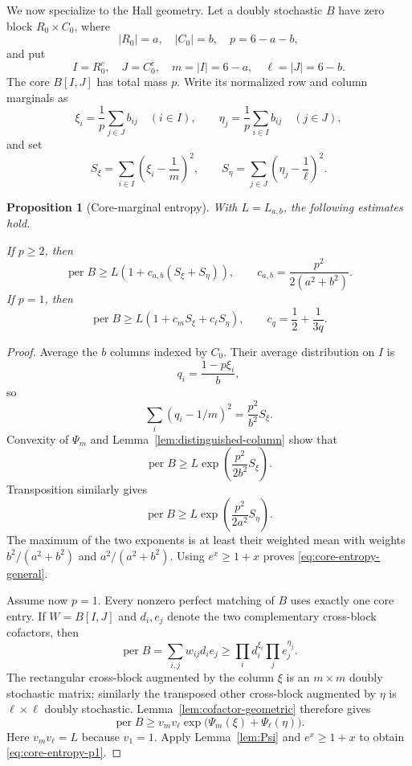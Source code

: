 \documentclass[11pt]{article}
\newtheorem{proposition}[theorem]{Proposition}
\theoremstyle{definition}
\DeclareMathOperator{\permop}{per}
\begin{document}
We now specialize to the Hall geometry.  Let a doubly stochastic $B$ have
zero block $R_0\times C_0$, where
\[
 |R_0|=a,\quad |C_0|=b,\quad p=6-a-b,
\]
and put
\[
 I=R_0^c,\quad J=C_0^c,\quad m=|I|=6-a,
 \quad \ell=|J|=6-b.
\]
The core $B[I,J]$ has total mass $p$.  Write its normalized row and column
marginals as
\[
 \xi_i=\frac1p\sum_{j\in J}b_{ij}\quad(i\in I),
 \qquad
 \eta_j=\frac1p\sum_{i\in I}b_{ij}\quad(j\in J),
\]
and set
\begin{equation}\label{eq:Sxi}
 S_\xi=\sum_{i\in I}\left(\xi_i-\frac1m\right)^2,
 \qquad
 S_\eta=\sum_{j\in J}\left(\eta_j-\frac1\ell\right)^2.
\end{equation}

\begin{proposition}[Core-marginal entropy]\label{prop:core-entropy}
With $L=L_{a,b}$, the following estimates hold.

If $p\ge2$, then
\begin{equation}\label{eq:core-entropy-general}
 \permop B\ge L\left(1+c_{a,b}(S_\xi+S_\eta)\right),
 \qquad
 c_{a,b}=\frac{p^2}{2(a^2+b^2)}.
\end{equation}
If $p=1$, then
\begin{equation}\label{eq:core-entropy-p1}
 \permop B\ge L\left(1+c_mS_\xi+c_\ell S_\eta\right),
 \qquad
 c_q=\frac12+\frac1{3q}.
\end{equation}
\end{proposition}

\begin{proof}
Average the $b$ columns indexed by $C_0$.  Their average distribution on $I$
is
\[
 q_i=\frac{1-p\xi_i}{b},
\]
so
\[
 \sum_i(q_i-1/m)^2=\frac{p^2}{b^2}S_\xi.
\]
Convexity of $\Psi_m$ and Lemma~\ref{lem:distinguished-column} show that
\[
 \permop B\ge L\exp\left(\frac{p^2}{2b^2}S_\xi\right).
\]
Transposition similarly gives
\[
 \permop B\ge L\exp\left(\frac{p^2}{2a^2}S_\eta\right).
\]
The maximum of the two exponents is at least their weighted mean with weights
$b^2/(a^2+b^2)$ and $a^2/(a^2+b^2)$.  Using $e^x\ge1+x$ proves
\eqref{eq:core-entropy-general}.

Assume now $p=1$.  Every nonzero perfect matching of $B$ uses exactly one
core entry.  If $W=B[I,J]$ and $d_i,e_j$ denote the two complementary
cross-block cofactors, then
\[
 \permop B=\sum_{i,j}w_{ij}d_ie_j
 \ge\prod_i d_i^{\xi_i}\prod_j e_j^{\eta_j}.
\]
The rectangular cross-block augmented by the column $\xi$ is an
$m\times m$ doubly stochastic matrix; similarly the transposed other
cross-block augmented by $\eta$ is $\ell\times\ell$ doubly stochastic.
Lemma~\ref{lem:cofactor-geometric} therefore gives
\[
 \permop B\ge v_mv_\ell
 \exp\bigl(\Psi_m(\xi)+\Psi_\ell(\eta)\bigr).
\]
Here $v_mv_\ell=L$ because $v_1=1$.  Apply
Lemma~\ref{lem:Psi} and $e^x\ge1+x$ to obtain
\eqref{eq:core-entropy-p1}.
\end{proof}
\end{document}
